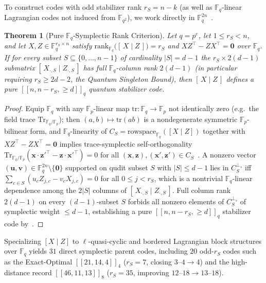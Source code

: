 \documentclass[11pt,a4paper]{article}
\newcommand{\vb}[1]{\symbf{#1}}
\newcommand{\vb}[1]{\mathbf{#1}}
\newtheorem{theorem}{Theorem}
\theoremstyle{remark}
\begin{document}
To construct codes with odd stabilizer rank $r_S = n - k$ (as well as $\mathbb{F}_q$-linear Lagrangian codes not induced from $\mathbb{F}_{q^2}$), we work directly in $\mathbb{F}_q^{2n}$~\cite{Ketkar2006}.

\begin{theorem}[Pure $\mathbb{F}_q$-Symplectic Rank Criterion]\label{thm:symplectic}
Let $q = p^e$, let $1 \le r_S < n$, and let $X, Z \in \mathbb{F}_q^{r_S \times n}$ satisfy $\mathrm{rank}_{\mathbb{F}_q}\!\bigl([\,X \;\big|\; Z\,]\bigr) = r_S$ and $X Z^\top - Z X^\top = \vb{0}$ over $\mathbb{F}_q$. If for every subset $S \subseteq \{0, \dots, n - 1\}$ of cardinality $|S| = d - 1$ the $r_S \times 2(d - 1)$ submatrix $[\,X_{\cdot, S} \;\big|\; Z_{\cdot, S}\,]$ has full $\mathbb{F}_q$-column rank $2(d - 1)$ (in particular requiring $r_S \ge 2d - 2$, the Quantum Singleton Bound), then $[\,X \;\big|\; Z\,]$ defines a pure $[[n, n - r_S, \ge d]]_q$ quantum stabilizer code.
\end{theorem}

\begin{proof}
Equip $\mathbb{F}_q$ with any $\mathbb{F}_p$-linear map $\mathrm{tr}: \mathbb{F}_q \to \mathbb{F}_p$ not identically zero (e.g.\ the field trace $\mathrm{Tr}_{\mathbb{F}_q/\mathbb{F}_p}$); then $(a, b) \mapsto \mathrm{tr}(ab)$ is a nondegenerate symmetric $\mathbb{F}_p$-bilinear form, and $\mathbb{F}_q$-linearity of $C_S = \mathrm{rowspace}_{\mathbb{F}_q}([X \mid Z])$ together with $X Z^\top - Z X^\top = \vb{0}$ implies trace-symplectic self-orthogonality $\mathrm{Tr}_{\mathbb{F}_q/\mathbb{F}_p}(\vb{x} \cdot \vb{z}'^\top - \vb{z} \cdot \vb{x}'^\top) = 0$ for all $(\vb{x}, \vb{z}), (\vb{x}', \vb{z}') \in C_S$~\cite[Lemma~16]{Ketkar2006}. A nonzero vector $(\vb{u}, \vb{v}) \in \mathbb{F}_q^{2n} \setminus \{\vb{0}\}$ supported on qudit subset $S$ with $|S| \le d - 1$ lies in $C_S^{\perp_s}$ iff $\sum_{c \in S} (u_c Z_{j,c} - v_c X_{j,c}) = 0$ for all $0 \le j < r_S$, which is a nontrivial $\mathbb{F}_q$-linear dependence among the $2|S|$ columns of $[\,X_{\cdot, S} \;\big|\; Z_{\cdot, S}\,]$. Full column rank $2(d - 1)$ on every $(d - 1)$-subset $S$ forbids all nonzero elements of $C_S^{\perp_s}$ of symplectic weight $\le d - 1$, establishing a pure $[[n, n - r_S, \ge d]]_q$ stabilizer code by~\cite[Corollary~19]{Ketkar2006}.
\end{proof}

Specializing $[X \mid Z]$ to $\ell$-quasi-cyclic and bordered Lagrangian block structures over $\mathbb{F}_q$ yields $31$ direct symplectic parent codes, including $20$ odd-$r_S$ codes such as the Exact-Optimal $[[21,14,4]]_4$ ($r_S = 7$, closing $3\text{--}4 \to 4$) and the high-distance record $[[46,11,13]]_8$ ($r_S = 35$, improving $12\text{--}18 \to 13\text{--}18$).
\end{document}

